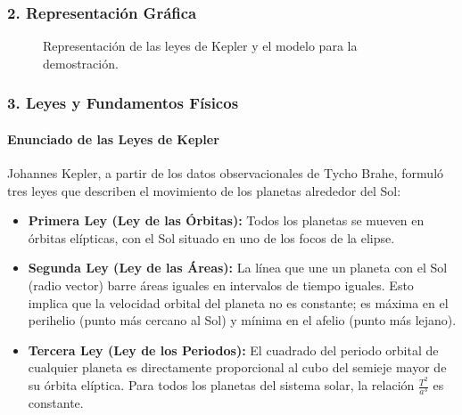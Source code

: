 \subsubsection*{2. Representación Gráfica}
\begin{figure}[H]
    \centering
    \hfill
    \caption{Representación de las leyes de Kepler y el modelo para la demostración.}
\end{figure}

\subsubsection*{3. Leyes y Fundamentos Físicos}
\paragraph{Enunciado de las Leyes de Kepler}
Johannes Kepler, a partir de los datos observacionales de Tycho Brahe, formuló tres leyes que describen el movimiento de los planetas alrededor del Sol:
\begin{itemize}
    \item \textbf{Primera Ley (Ley de las Órbitas):} Todos los planetas se mueven en órbitas elípticas, con el Sol situado en uno de los focos de la elipse.
    \item \textbf{Segunda Ley (Ley de las Áreas):} La línea que une un planeta con el Sol (radio vector) barre áreas iguales en intervalos de tiempo iguales. Esto implica que la velocidad orbital del planeta no es constante; es máxima en el perihelio (punto más cercano al Sol) y mínima en el afelio (punto más lejano).
    \item \textbf{Tercera Ley (Ley de los Periodos):} El cuadrado del periodo orbital de cualquier planeta es directamente proporcional al cubo del semieje mayor de su órbita elíptica. Para todos los planetas del sistema solar, la relación $\frac{T^2}{a^3}$ es constante.
\end{itemize}


